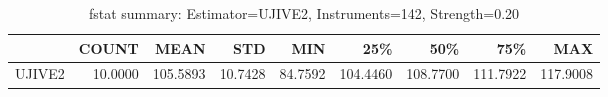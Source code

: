 \begin{table}[ht]
\centering
\caption{fstat summary: Estimator=UJIVE2, Instruments=142, Strength=0.20}
\begin{tabular}{lrrrrrrrr}
\toprule
 & COUNT & MEAN & STD & MIN & 25\% & 50\% & 75\% & MAX \\
\midrule
UJIVE2 & 10.0000 & 105.5893 & 10.7428 & 84.7592 & 104.4460 & 108.7700 & 111.7922 & 117.9008 \\
\bottomrule
\end{tabular}
\end{table}
